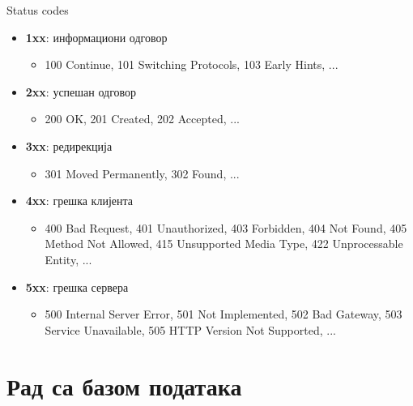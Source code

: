 \documentclass{beamer}
\begin{document}
    \begin{frame}{Status codes}
        \begin{itemize}
            \item \textbf{1xx}: информациони одговор
            \begin{itemize}
                \item 100 Continue, 101 Switching Protocols, 103 Early Hints, ...
            \end{itemize}
            \item \textbf{2xx}: успешан одговор
            \begin{itemize}
                \item 200 OK, 201 Created, 202 Accepted, ...
            \end{itemize}
            \item \textbf{3xx}: редирекција
            \begin{itemize}
                \item 301 Moved Permanently, 302 Found, ...
            \end{itemize}
            \item \textbf{4xx}: грешка клијента
            \begin{itemize}
                \item 400 Bad Request, 401 Unauthorized, 403 Forbidden, 404 Not Found, 405 Method Not Allowed, 415 Unsupported Media Type, 422 Unprocessable Entity, ...
            \end{itemize}
            \item \textbf{5xx}: грешка сервера
            \begin{itemize}
                \item 500 Internal Server Error, 501 Not Implemented, 502 Bad Gateway, 503 Service Unavailable, 505 HTTP Version Not Supported, ...
            \end{itemize}
        \end{itemize}
    \end{frame}
    
    \section{Рад са базом података}
    
\end{document}
